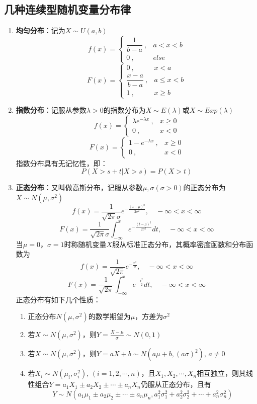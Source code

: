 \documentclass[12pt,a4paper,UTF8]{book}
\begin{document}
\subsection{几种连续型随机变量分布律}
\begin{enumerate}
\item \textbf{均匀分布}：记为$X\sim U\left(a,b\right)$
\[f\left(x\right)=\left\{\begin{matrix}
\dfrac{1}{b-a}\ ,&a<x<b\\
0\ ,&else
\end{matrix}\right.\]
\[F\left(x\right)=\left\{\begin{matrix}
0\ ,&x<a\\
\dfrac{x-a}{b-a}\ ,&a\leq x<b\\
1\ ,&x\geq b
\end{matrix}\right.\]
\item \textbf{指数分布}：记服从参数$\lambda>0$的指数分布为$X\sim E\left(\lambda\right)$或$X\sim Exp\left(\lambda\right)$
\[f\left(x\right)=\left\{\begin{matrix}
\lambda e^{-\lambda x}\ ,&x\geq0\\
0\ ,&x<0
\end{matrix}\right.\]
\[F\left(x\right)=\left\{\begin{matrix}
1-e^{-\lambda x}\ ,&x\geq0\\
0\ ,&x<0
\end{matrix}\right.\]
指数分布具有无记忆性，即：
\[P\left(X>s+t|X>s\right)=P\left(X>t\right)\]
\item \textbf{正态分布}：又叫做高斯分布，记服从参数$\mu,\sigma\left(\sigma>0\right)$的正态分布为$X\sim N\left(\mu,\sigma^2\right)$
\[f\left(x\right)=\frac{1}{\sqrt{2\pi}\sigma}e^{-\frac{\left(x-\mu\right)^2}{2\sigma^2}},\quad-\infty<x<\infty\]
\[F\left(x\right)=\frac{1}{\sqrt{2\pi}\sigma}\int_{-\infty}^{x}e^{-\frac{\left(t-\mu\right)^2}{2\sigma^2}}dt,\quad-\infty<x<\infty\]
当$\mu=0$，$\sigma=1$时称随机变量$X$服从标准正态分布，其概率密度函数和分布函数为
\[f\left(x\right)=\frac{1}{\sqrt{2\pi}}e^{-\frac{x^2}{2}},\quad-\infty<x<\infty\]
\[F\left(x\right)=\frac{1}{\sqrt{2\pi}}\int_{-\infty}^{x}e^{-\frac{t^2}{2}}dt,\quad-\infty<x<\infty\]
正态分布有如下几个性质：
\begin{enumerate}
\item 正态分布$N\left(\mu,\sigma^2\right)$的数学期望为$\mu$，方差为$\sigma^2$
\item 若$X\sim N\left(\mu,\sigma^2\right)$，则$Y=\frac{X-\mu}{\sigma}\sim N\left(0,1\right)$
\item 若$X\sim N\left(\mu,\sigma^2\right)$，则$Y=aX+b\sim N\left(a\mu+b,\left(a\sigma\right)^2\right),\,a\neq0$
\item 若$X_i\sim N\left(\mu_i,\sigma_i^2\right),\,\left(i=1,2,\cdots,n\right)$，且$X_1,X_2,\cdots,X_n$相互独立，则其线性组合$Y=a_1X_1\pm a_2X_2\pm\cdots\pm a_nX_n$仍服从正态分布，且有
\[Y\sim N\left(a_1\mu_1\pm a_2\mu_2\pm\cdots\pm a_n\mu_n,a_1^2\sigma_1^2+a_2^2\sigma_2^2+\cdots+a_n^2\sigma_n^2\right)\]
\end{enumerate}
\end{enumerate}
\end{document}
